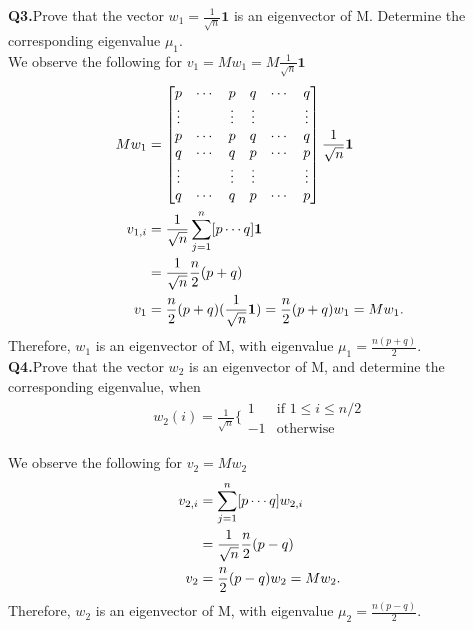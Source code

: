 \documentclass[9pt]{article}
\def\i{\mathbf{1}} %
\begin{document}
\textbf{Q3.}Prove that the vector $w_1 = \frac{1}{\sqrt{n}}\i$ is an eigenvector of M. Determine the corresponding eigenvalue $\mu_1$.\\
We observe the following for $v_1 = Mw_1 = M\frac{1}{\sqrt{n}}\i$
\begin{align}
Mw_1 &= \begin{bmatrix}
p & \cdots &p&q&\cdots&q\\
\vdots &  &\vdots &\vdots & &\vdots\\
p & \cdots &p&q&\cdots&q\\
q & \cdots &q&p&\cdots&p\\
\vdots &  &\vdots &\vdots & &\vdots\\
q & \cdots &q&p&\cdots&p\\
\end{bmatrix}\frac{1}{\sqrt{n}}\i \\
v_{1,i} &= \frac{1}{\sqrt{n}}\sum_{j=1}^n [ p \cdots q ]\i \notag\\
&= \frac{1}{\sqrt{n}} \frac{n}{2}(p+q) \notag\\
v_1 &=  \frac{n}{2}(p+q) ( \frac{1}{\sqrt{n}} \i) = \frac{n}{2}(p+q)w_1 = Mw_1.
\end{align}
Therefore, $w_1$ is an eigenvector of M, with eigenvalue $\mu_1 = \frac{n(p+q)}{2}$.\\

\textbf{Q4.}Prove that the vector $w_2 $ is an eigenvector of M, and determine the corresponding eigenvalue, when 
\begin{align}
w_2(i) = \frac{1}{\sqrt{n}}\bigg\lbrace \begin{array}{cc}
1 & \text{if } 1 \leq i \leq n/2 \\
-1 & \text{otherwise} 
\end{array} 
\end{align}	

We observe the following for $v_2 = Mw_2 $
\begin{align}
v_{2,i} &= \sum_{j=1}^n [ p \cdots q ] w_{2,i}\\
&= \frac{1}{\sqrt{n}} \frac{n}{2}(p-q) \notag\\
v_2 &= \frac{n}{2}(p-q)w_2=  Mw_2.
\end{align}
Therefore, $w_2$ is an eigenvector of M, with eigenvalue $\mu_2 = \frac{n(p-q)}{2}$.
\end{document}
